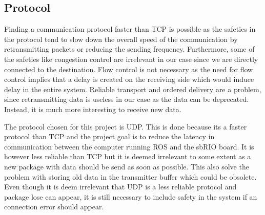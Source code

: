 \subsection{Protocol}\label{sec:Protocol}

Finding a communication protocol faster than TCP is possible as the safeties in the protocol tend to slow down the overall speed of the communication by retransmitting packets or reducing the sending frequency\cite{TCP_IETF}. Furthermore, some of the safeties like congestion control are irrelevant in our case since we are directly connected to the destination. Flow control is not necessary as the need for flow control implies that a delay is created on the receiving side which would induce delay in the entire system. Reliable transport and ordered delivery are a problem, since retransmitting data is useless in our case as the data can be deprecated. Instead, it is much more interesting to receive new data. 

The protocol chosen for this project is \gls{UDP}. This is done because its a faster protocol than TCP and the project goal is to reduce the latency in communication between the computer running ROS and the sbRIO board. It is however less reliable than TCP but it is deemed irrelevant to some extent as a new package with data should be send as soon as possible. This also solve the problem with storing old data in the transmitter buffer which could be obsolete. Even though it is deem irrelevant that \gls{UDP} is a less reliable protocol and package lose can appear, it is still necessary to include safety in the system if an connection error should appear.  





